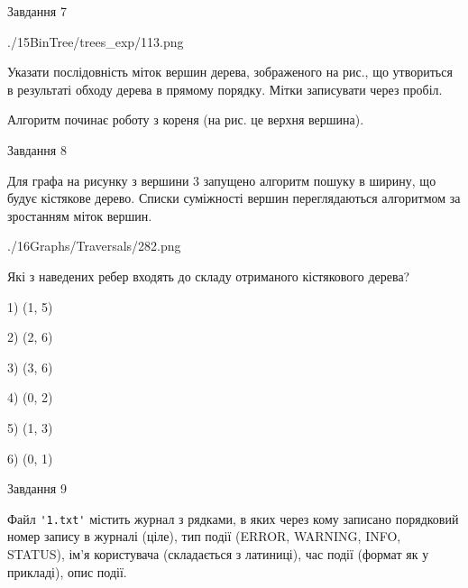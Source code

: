 \documentclass[12pt, ukrainian]{article}
\def\code#1{\Verb!#1!}
\begin{document}
{\vspace{10mm}\par

\newpage
\begin{minipage}[t]{9.7cm}
               
{\begin{center}Завдання {7}\end{center}}
\vspace{-6mm}

\begin{center}
	{./15BinTree/trees_exp/113.png}
\end{center}
Указати послідовність міток вершин дерева, зображеного на рис., що утвориться в результаті обходу дерева в прямому порядку. Мітки записувати через пробіл.\par Алгоритм починає роботу з кореня (на рис. це верхня вершина).\par

\end{minipage}
\vline \hspace{8mm}
\begin{minipage}[t]{8.0cm}
               
{\begin{center}Завдання {8}\end{center}}
\vspace{-6mm}
Для графа на рисунку з вершини 3 запущено алгоритм пошуку в ширину, що будує кістякове дерево. Списки суміжності вершин переглядаються алгоритмом за зростанням міток вершин.\par
\begin{center}
	{./16Graphs/Traversals/282.png}
\end{center}
\par Які з наведених ребер входять до складу отриманого кістякового дерева?\par
1) (1, 5)\par
2) (2, 6)\par
3) (3, 6)\par
4) (0, 2)\par
5) (1, 3)\par
6) (0, 1)\par
{\vskip 15pt} \par

\end{minipage}

               
{\begin{center}Завдання {9}\end{center}}
\vspace{-6mm}
Файл \code{'1.txt'} містить журнал з рядками, в яких через кому записано поряд\-ко\-вий номер запису в журналі (ціле), тип події (ERROR, WARNING, INFO, STATUS), ім'я користувача (складається з латиниці), час події (фор\-мат як у прикладі), опис події.

}
\end{document}
